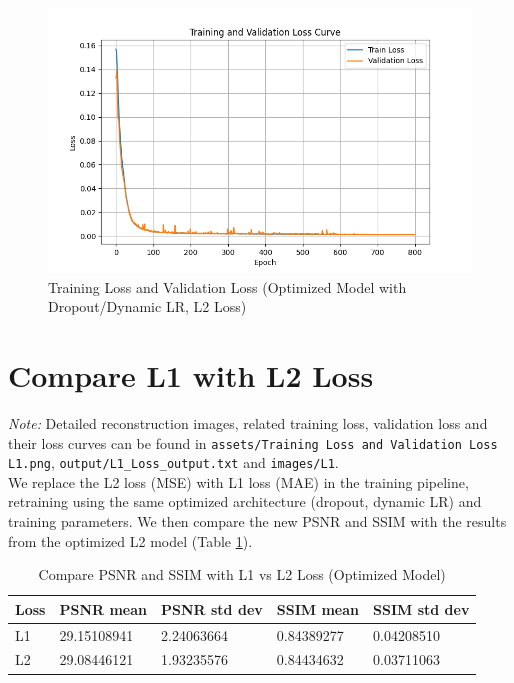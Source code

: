 \documentclass{article}
\begin{document}
\begin{figure}[ht]
  \centering
  \includegraphics[width=\linewidth]{../assets/Training Loss and Validation Loss.png}
  \caption{Training Loss and Validation Loss (Optimized Model with Dropout/Dynamic LR, L2 Loss)}
  \label{fig:loss_opt}
\end{figure}



\section{Compare L1 with L2 Loss}
\textit{Note: }Detailed reconstruction images, related training loss, validation loss and their
loss curves can be found in \texttt{assets/Training Loss and Validation Loss L1.png},
\texttt{output/L1\_Loss\_output.txt} and \texttt{images/L1}.\\
We replace the L2 loss (MSE) with L1 loss (MAE) in the training pipeline, retraining using the same optimized architecture (dropout, dynamic LR) and training parameters. We then compare the new PSNR and SSIM with the results from the optimized L2 model (Table \ref{tab:loss_compare}).

\begin{table}[H]
  \caption{Compare PSNR and SSIM with L1 vs L2 Loss (Optimized Model)}
  \label{tab:loss_compare}
  \centering
  \begin{tabular}{lllll}
    \toprule
    Loss & PSNR mean   & PSNR std dev & SSIM mean  & SSIM std dev \\
    \midrule
    L1   & 29.15108941 & 2.24063664   & 0.84389277 & 0.04208510   \\
    L2   & 29.08446121 & 1.93235576   & 0.84434632 & 0.03711063   \\
    \bottomrule
  \end{tabular}
\end{table}
\end{document}
